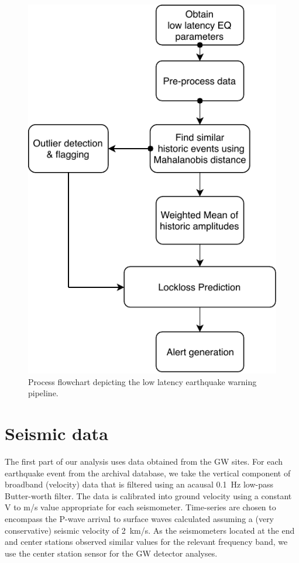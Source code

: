 \documentclass[twocolumn, aps, superscriptaddress]{revtex4}
\begin{document}
 \begin{figure}[!htb]
 \includegraphics[scale=0.7]{./plots/SEISMON_flowchart.pdf}
 \caption{Process flowchart depicting the low latency earthquake warning pipeline.}
 \label{fig:flowchart}
\end{figure}   

\section{Seismic data}\label{sec:data}

The first part of our analysis uses data obtained from the GW sites. For each earthquake event from the archival database, we take the vertical component of broadband (velocity) data that is filtered using an acausal 0.1\, Hz low-pass Butter-worth filter. The data is calibrated into ground velocity using a constant V to m/s value appropriate for each seismometer. Time-series are chosen to encompass the P-wave arrival to surface waves calculated assuming a (very conservative) seismic velocity of 2\, km/s. As the seismometers located at the end and center stations observed similar values for the relevant frequency band, we use the center station sensor for the GW detector analyses.
\end{document}
